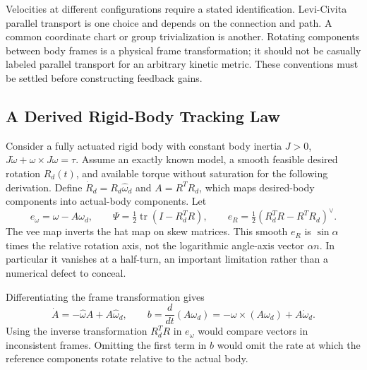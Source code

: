 Velocities at different configurations require a stated identification.
Levi-Civita parallel transport is one choice and depends on the connection
and path. A common coordinate chart or group trivialization is another.
Rotating components between body frames is a physical frame transformation;
it should not be casually labeled parallel transport for an arbitrary kinetic
metric. These conventions must be settled before constructing feedback gains.

\subsection{A Derived Rigid-Body Tracking Law}

Consider a fully actuated rigid body with constant body inertia $J>0$,
$J\dot\omega+\omega\times J\omega=\tau$. Assume an exactly known model,
a smooth feasible desired rotation $R_d(t)$, and available torque without
saturation for the following derivation. Define $\dot R_d=R_d\widehat\omega_d$
and $A=R^TR_d$, which maps desired-body components into actual-body components.
Let
\begin{equation}\label{eq:manifold_attitude_errors}
 e_\omega=\omega-A\omega_d,\qquad
 \Psi=\tfrac12\operatorname{tr}(I-R_d^TR),\qquad
 e_R=\tfrac12(R_d^TR-R^TR_d)^\vee.
\end{equation}
The vee map inverts the hat map on skew matrices. This smooth $e_R$ is
$\sin\alpha$ times the relative rotation axis, not the logarithmic angle-axis
vector $\alpha n$. In particular it vanishes at a half-turn, an important
limitation rather than a numerical defect to conceal.

Differentiating the frame transformation gives
\begin{equation}\label{eq:manifold_attitude_transport}
 \dot A=-\widehat\omega A+A\widehat\omega_d,\qquad
 b=\frac{d}{dt}(A\omega_d)=-\omega\times(A\omega_d)+A\dot\omega_d.
\end{equation}
Using the inverse transformation $R_d^TR$ in $e_\omega$ would compare vectors
in inconsistent frames. Omitting the first term in $b$ would omit the rate
at which the reference components rotate relative to the actual body.

